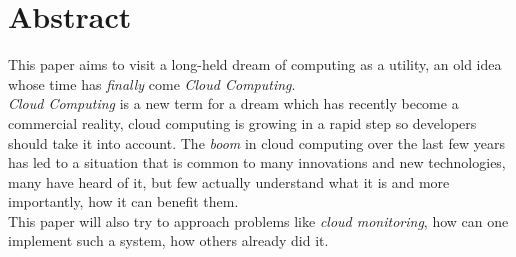 \documentclass[a4paper,12pt,titlepage]{scrreprt}
\begin{document}
\chapter{Abstract}
  This paper aims to visit a long-held dream of computing as a utility, an old idea whose time has \emph{finally} come 
\emph{Cloud Computing}.\\[0.1cm]
\emph{Cloud Computing} is a new term for a dream which has recently become a commercial reality, cloud computing is
growing in a rapid step so developers should take it into account. 
The \emph{boom} in cloud computing over the last few years has led to a situation that is common to many innovations
and new technologies, many have heard of it, but few actually understand what it is and more importantly, 
how it can benefit them.\\
This paper will also try to approach problems like \emph{cloud monitoring}, how can one implement such a system, how others
already did it.

\setcounter{secnumdepth}{3}
\setcounter{chapter}{0}

\tableofcontents

\cleardoublepage







%
%
\end{document}
